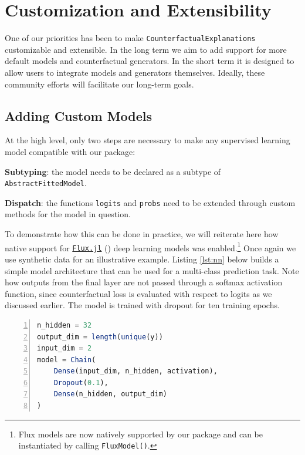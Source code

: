 \documentclass{juliacon}
\begin{document}
\hypertarget{sec-custom}{%
\section{Customization and Extensibility}\label{sec-custom}}

One of our priorities has been to make
\texttt{CounterfactualExplanations} customizable and extensible. In the
long term we aim to add support for more default models and
counterfactual generators. In the short term it is designed to allow
users to integrate models and generators themselves. Ideally, these
community efforts will facilitate our long-term goals.

\hypertarget{sec-custom-mod}{%
\subsection{Adding Custom Models}\label{sec-custom-mod}}

At the high level, only two steps are necessary to make any supervised
learning model compatible with our package:

\begin{unnumlist}
\item \textbf{Subtyping}: the model needs to be declared as a subtype of \texttt{AbstractFittedModel}.
\item \textbf{Dispatch}: the functions \texttt{logits} and \texttt{probs} need to be extended through custom methods for the model in question.
\end{unnumlist}

To demonstrate how this can be done in practice, we will reiterate here
how native support for \href{https://fluxml.ai/}{\texttt{Flux.jl}}
(\cite{innes2018flux}) deep learning models was enabled.\footnote{Flux
  models are now natively supported by our package and can be
  instantiated by calling \texttt{FluxModel()}.} Once again we use
synthetic data for an illustrative example. Listing \ref{lst:nn} below
builds a simple model architecture that can be used for a multi-class
prediction task. Note how outputs from the final layer are not passed
through a softmax activation function, since counterfactual loss is
evaluated with respect to logits as we discussed earlier. The model is
trained with dropout for ten training epochs.

\begin{lstlisting}[language=Julia, escapechar=@, numbers=left, label={lst:nn}, caption={}]
n_hidden = 32
output_dim = length(unique(y))
input_dim = 2
model = Chain(
    Dense(input_dim, n_hidden, activation),
    Dropout(0.1),
    Dense(n_hidden, output_dim)
)  
\end{lstlisting}
\end{document}
